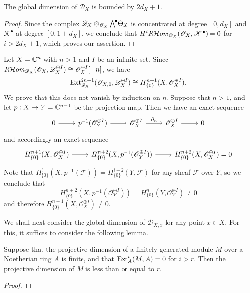 \begin{theorem}\label{D-module global dimension 2n+1}
The global dimension of $\mathscr{D}_X$ is bounded by $2d_X+1$.
\end{theorem}
\begin{proof}
Since the complex $\mathscr{D}_X\otimes_{\mathscr{O}_X}\bigw^\bullet\Theta_X$ is concentrated at degree $[0,d_X]$ and $\mathscr{K}^\bullet$ at degree $[0,1+d_X]$, we conclude that $H^iR\!\operatorname{\mathcal{H}\hspace*{-0.4pt}\textit{om}\hspace{0.5pt}}_{\mathscr{D}_X}(\mathscr{O}_X,\mathscr{K}^\bullet)=0$ for $i>2d_X+1$, which proves our assertion.
\end{proof}

\begin{remark}
Let $X=\mathbb{C}^n$ with $n>1$ and $I$ be an infinite set. Since $R\!\operatorname{\mathcal{H}\hspace*{-0.4pt}\textit{om}\hspace{0.5pt}}_{\mathscr{D}_X}(\mathscr{O}_X,\mathscr{D}_X^{\oplus I})\cong\mathscr{O}_X^{\oplus I}[-n]$, we have
\[\mathrm{Ext}_{\mathscr{D}_X}^{2n+1}(\mathscr{O}_{X,0},\mathscr{D}_X^{\oplus I})\cong H_{\{0\}}^{n+1}(X,\mathscr{O}_X^{\oplus I}).\]
We prove that this does not vanish by induction on $n$. Suppose that $n>1$, and let $p:X\to Y=\mathbb{C}^{n-1}$ be the projection map. Then we have an exact sequence
\[\begin{tikzcd}
0\ar[r]&p^{-1}(\mathscr{O}_Y^{\oplus I})\ar[r]&\mathscr{O}_X^{\oplus I}\ar[r,"\partial_n"]&\mathscr{O}_X^{\oplus I}\ar[r]&0
\end{tikzcd}\]
and accordingly an exact sequence
\[\begin{tikzcd}
H_{\{0\}}^{n+1}(X,\mathscr{O}_X^{\oplus I})\ar[r]&H_{\{0\}}^{n+2}(X,p^{-1}(\mathscr{O}_Y^{\oplus I}))\ar[r]&H_{\{0\}}^{n+2}(X,\mathscr{O}_X^{\oplus I})=0
\end{tikzcd}\]
Note that $H^i_{\{0\}}(X,p^{-1}(\mathscr{F}))=H^{i-2}_{\{0\}}(Y,\mathscr{F})$ for any sheaf $\mathscr{F}$ over $Y$, so we conclude that
\[H^{n+2}_{\{0\}}(X,p^{-1}(\mathscr{O}_Y^{\oplus I}))=H^n_{\{0\}}(Y,\mathscr{O}_Y^{\oplus I})\neq 0\]
and therefore $H^{n+1}_{\{0\}}(X,\mathscr{O}_X^{\oplus I})\neq 0$.
\end{remark}

We shall next consider the global dimension of $\mathscr{D}_{X,x}$ for any point $x\in X$. For this, it suffices to consider the following lemma.
\begin{lemma}\label{Noe ring finite module projdim finite if Ext bounded}
Suppose that the projective dimension of a finitely generated module $M$ over a Noetherian ring $A$ is finite, and that $\mathrm{Ext}_A^i(M,A)=0$ for $i>r$. Then the projective dimension of $M$ is less than or equal to $r$.
\end{lemma}
\begin{proof}

\end{proof}

